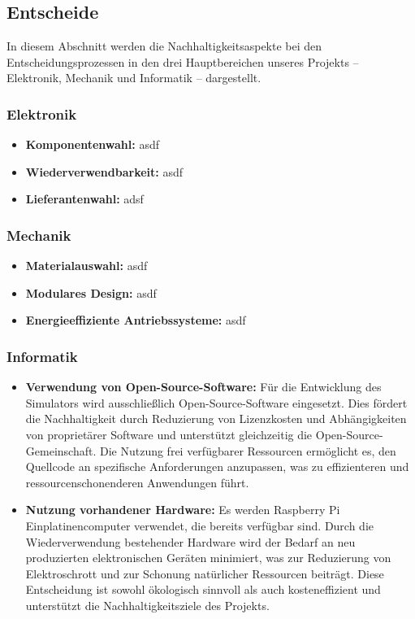 \documentclass[../../main.tex]{subfiles} %
\begin{document}
\subsection{Entscheide}

In diesem Abschnitt werden die Nachhaltigkeitsaspekte bei den
Entscheidungsprozessen in den drei Hauptbereichen unseres Projekts –
Elektronik, Mechanik und Informatik – dargestellt.

\subsubsection{Elektronik}

\begin{itemize}
  \item \textbf{Komponentenwahl:} asdf
  \item \textbf{Wiederverwendbarkeit:} asdf
  \item \textbf{Lieferantenwahl:} adsf
\end{itemize}

\subsubsection{Mechanik}

\begin{itemize}
  \item \textbf{Materialauswahl:} asdf
  \item \textbf{Modulares Design:} asdf
  \item \textbf{Energieeffiziente Antriebssysteme:} asdf
\end{itemize}

\subsubsection{Informatik}

\begin{itemize}
  \item \textbf{Verwendung von Open-Source-Software:} Für die
    Entwicklung des Simulators wird ausschließlich
    Open-Source-Software eingesetzt. Dies fördert die Nachhaltigkeit
    durch Reduzierung von Lizenzkosten und Abhängigkeiten von
    proprietärer Software und unterstützt gleichzeitig die
    Open-Source-Gemeinschaft. Die Nutzung frei verfügbarer Ressourcen
    ermöglicht es, den Quellcode an spezifische Anforderungen
    anzupassen, was zu effizienteren und ressourcenschonenderen
    Anwendungen führt.

  \item \textbf{Nutzung vorhandener Hardware:} Es werden Raspberry Pi
    Einplatinencomputer verwendet, die bereits verfügbar sind. Durch
    die Wiederverwendung bestehender Hardware wird der Bedarf an neu
    produzierten elektronischen Geräten minimiert, was zur
    Reduzierung von Elektroschrott und zur Schonung natürlicher
    Ressourcen beiträgt. Diese Entscheidung ist sowohl ökologisch
    sinnvoll als auch kosteneffizient und unterstützt die
    Nachhaltigkeitsziele des Projekts.
\end{itemize}
\end{document}
